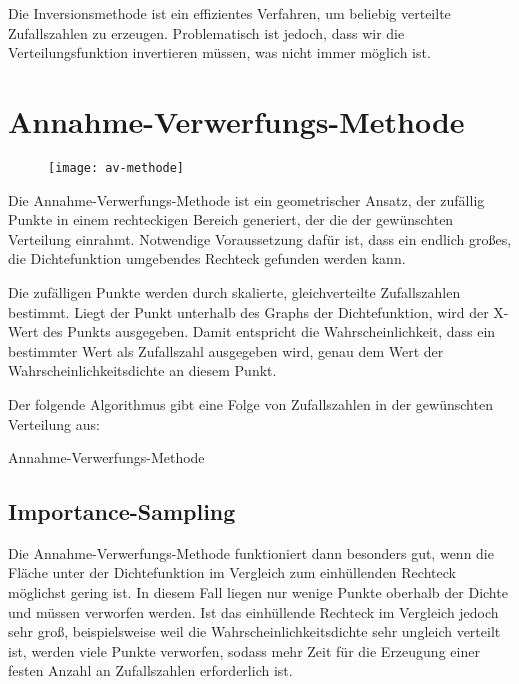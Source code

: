 Die Inversionsmethode ist ein effizientes Verfahren, um beliebig verteilte
Zufallszahlen zu erzeugen. Problematisch ist jedoch, dass wir die
Verteilungsfunktion invertieren müssen, was nicht immer möglich ist.

\section{Annahme-Verwerfungs-Methode}

\begin{wrapfigure}{r}{0.5\textwidth}
\centering
\texttt{[image: av-methode]}
\end{wrapfigure}
Die Annahme-Verwerfungs-Methode ist ein geometrischer Ansatz, der zufällig
Punkte in einem rechteckigen Bereich generiert, der die
 der gewünschten Verteilung einrahmt.
Notwendige Voraussetzung dafür ist, dass ein endlich großes, die Dichtefunktion
umgebendes Rechteck gefunden werden kann.

Die zufälligen Punkte werden durch skalierte, gleichverteilte Zufallszahlen
bestimmt. Liegt der Punkt unterhalb des Graphs der Dichtefunktion, wird der
X-Wert des Punkts ausgegeben. Damit entspricht die Wahrscheinlichkeit, dass ein
bestimmter Wert als Zufallszahl ausgegeben wird, genau dem Wert der
Wahrscheinlichkeitsdichte an diesem Punkt.

Der folgende Algorithmus gibt eine Folge von Zufallszahlen in der gewünschten
Verteilung aus:

\begin{algorithm}[h!]
\DontPrintSemicolon
\LinesNumbered



\caption{Annahme-Verwerfungs-Methode}\label{algo:av-methode}
\end{algorithm}

\subsection{Importance-Sampling}

Die Annahme-Verwerfungs-Methode funktioniert dann besonders gut, wenn die Fläche
unter der Dichtefunktion im Vergleich zum einhüllenden Rechteck möglichst gering
ist. In diesem Fall liegen nur wenige Punkte oberhalb der Dichte und müssen
verworfen werden. Ist das einhüllende Rechteck im Vergleich jedoch sehr groß,
beispielsweise weil die Wahrscheinlichkeitsdichte sehr ungleich verteilt ist,
werden viele Punkte verworfen, sodass mehr Zeit für die Erzeugung einer festen
Anzahl an Zufallszahlen erforderlich ist.


